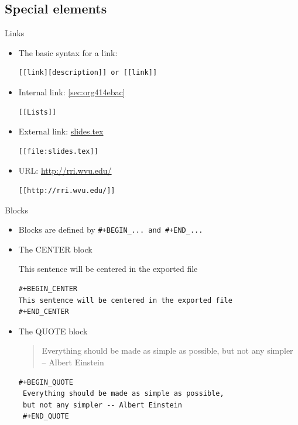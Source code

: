 \documentclass[presentation]{beamer}
\begin{document}
\subsection{Special elements}
\label{sec:orgd69ee3c}

\begin{frame}[fragile,label={sec:orgaa7cd64}]{Links}
 \begin{itemize}
\item The basic syntax for a link:
\begin{verbatim}
[[link][description]] or [[link]]
\end{verbatim}

\item Internal link: \ref{sec:org414ebac}
\begin{verbatim}
[[Lists]]
\end{verbatim}

\item External link: \url{slides.tex}
\begin{verbatim}
[[file:slides.tex]]
\end{verbatim}

\item URL: \url{http://rri.wvu.edu/}
\begin{verbatim}
[[http://rri.wvu.edu/]]
\end{verbatim}
\end{itemize}
\end{frame}

\begin{frame}[fragile,label={sec:org7b69c18}]{Blocks}
 \begin{itemize}
\item Blocks are defined by \texttt{\#+BEGIN\_... and \#+END\_...}

\item The CENTER block

\begin{center}
This sentence will be centered in the exported file
\end{center}

\begin{verbatim}
#+BEGIN_CENTER
This sentence will be centered in the exported file
#+END_CENTER
\end{verbatim}

\item The QUOTE block

\begin{quote}
Everything should be made as simple as possible,
but not any simpler -- Albert Einstein
\end{quote}

\begin{verbatim}
#+BEGIN_QUOTE
 Everything should be made as simple as possible,
 but not any simpler -- Albert Einstein
 #+END_QUOTE
\end{verbatim}
\end{itemize}
\end{frame}
\end{document}

